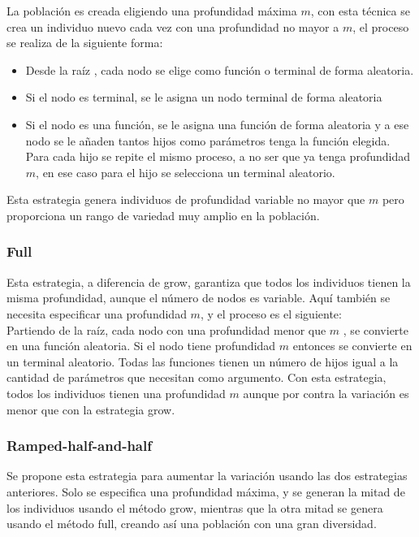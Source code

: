 \documentclass[12pt]{article} \usepackage[utf8]{inputenc}
\begin{document}
La población es creada eligiendo una profundidad máxima \(m\),
con esta técnica se crea un individuo nuevo cada vez con una
profundidad no mayor a \(m\),
el proceso se realiza de la siguiente forma:
\begin{itemize}
\item Desde la raíz , cada nodo se elige como función o terminal de
  forma aleatoria.
\item Si el nodo es terminal, se le asigna un nodo terminal de forma
  aleatoria
\item Si el nodo es una función, se le asigna una función de forma
  aleatoria y a ese nodo se le añaden tantos hijos como parámetros
  tenga la función elegida. Para cada hijo se repite el mismo proceso,
  a no ser que ya tenga profundidad \(m\),
  en ese caso para el hijo se selecciona un terminal aleatorio.
\end{itemize}

Esta estrategia genera individuos de profundidad variable no mayor que
\(m\) pero proporciona un rango de variedad muy amplio en la población.

\subsubsection{Full}

Esta estrategia, a diferencia de grow, garantiza que todos los
individuos tienen la misma profundidad, aunque el número de nodos es
variable. Aquí también se necesita especificar una profundidad \(m\),
y el proceso es el siguiente:\\

Partiendo de la raíz, cada nodo con una profundidad menor que \(m\)
, se convierte en una función aleatoria. Si el nodo tiene profundidad
\(m\) entonces se convierte en un terminal aleatorio. Todas las funciones
tienen un número de hijos igual a la cantidad de parámetros que necesitan
como argumento. Con esta estrategia, todos los individuos
tienen una profundidad \(m\) aunque por contra la variación es menor
que con la estrategia grow.\\

\subsubsection{Ramped-half-and-half}

Se propone esta estrategia para aumentar la variación usando las dos
estrategias anteriores. Solo se especifica una profundidad máxima, y
se generan la mitad de los individuos usando el método grow, mientras
que la otra mitad se genera usando el método full, creando así una
población con una gran diversidad.
\end{document}
